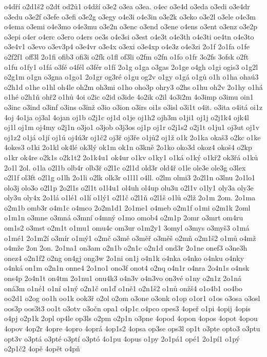 o4dří
o2d1š2
o2dť
od2ů1
o4dží
o3e2
o3ea
o3ea.
o4ec
o3e4d
o3eda
o3edi
o3e4dr
o3edu
o3e2f
o3efe
o3efi
o3e2g
o3egy
o4e3i
o4e3in
o3e2k
o3eko
o3e2l
o3ele
o4e3m
o4ema
o3emi
o4e3mo
o4e3mu
o3e2n
o3enc
o3end
o3ene
o4ens
o3ent
o3enz
o3e2p
o3epi
o4er
o4erc
o3ero
o4ers
oe3s
o4e3si
o3est
o4e3t
o4e3th
o4e3ti
oe4tn
o4e3to
o3e4v1
o3evo
o3ev3p4
o3e4vr
o3e4x
o3exi
o3e4xp
o4e3z
o4e3zi
2o1f
2o1fa
o1fe
o2f2f1
off3l
2o1fi
ofib3
ofi3i
o2fk
o1fl
of3li
o2fm
o2fn
o1fo
o1fr
3o2fs
3ofsk
o2ft
o1fu
o1fy1
o1fá
o3fé
o4fél
o3fér
o1fí
2o1g
o1ga
o3gas
2o1ge
o4gh
o1gi
ogis3
o1g2l
o2g1m
o1gn
o3gna
o1go1
2o1gr
og3ré
o1gu
og2v
o1gy
o1gá
o1gů
o1h
o1ha
ohaú3
o2h1d
o1he
o1hl
oh4le
oh2m
oh3mi
o1ho
oho3p
ohry3
o2hs
o1hu
oh2v
2o1hy
o1há
o1hé
o2h1ň
ohř2
o1hů
4oi
o2ic
o2id
o3ide
4o2ik
o2il
4o3i2m
4o3imp
o3imu
oin1
o3inc
o3ind
o3inf
o3ins
o3inž
o3io
o3ion
o3irs
oi1s
o3isl
o3i1t
o4it.
o3ita
o4itá
oi1z
4oj
4o1ja
oj3al
4ojan
oj1b
o2j1c
oj1d
o1je
oj1h2
ojh3m
o1ji1
oj1j
o2j1k4
ojk4l
oj1l
oj1m
oj4my
o2j1n
o3jo1
o3job
o3j3os
oj1p
oj1r
o2j1s2
o2j1t
o1ju1
oj3ut
oj1v
oj1z2
o1já
o1jí
oj1ú
oj4ú3r
oj1č2
oj3ř
oj3ře
o1jů2
oj1ž
o1k
2o1ka
okaš3
o2kc
o1ke
4okes3
o1ki
2o1kl
ok4lé
ok3lý
ok1m
ok1n
o3kně
2o1ko
oko3d
okoz4
okoš4
o2kp
o1kr
ok4re
o2k1s
o2k1t2
2o1k4u1
ok4ur
o1kv
o1ky1
o1ká
o1ký
o1kř2
ok3řá
o1ků
2o1l
2ol.
o1la
o2l1b
olb4r
olb3ř
o2l1c
o2l1d
old3r
old4ř
o1le
ole3e
ole3g
o3lex
o2l1f
ol3ft
o2l1g
o1lh
2o1li
o2lk
olk3r
o1l1l
o4ll.
o2lm
olmi3
2o2l1n
o3lnu
2o1lo1
olo3j
olo3o
o2l1p
2o2l1s
o2l1t
o1l4u1
ol4uh
ol4up
olu3u
o2l1v
o1ly1
oly3a
oly3e
oly3u
oly4x
2o1lá
o1lé1
o1lí
o1lý1
o2l1č
o2l1ň
o2l1š
o1lů
o2lž
2o1m
2om.
2o1ma
o2m1b
omb3r
o4m1c
o4mco
2o2m1d1
2o1me1
o4meb
o2m1f
o1mi
o2m1k
2oml
o1m1n
o3mne
o3mná
o3mní
o4mný
o1mo
omob4
o2m1p
2omr
o3mrt
om4ru
om1s2
o3mst
o2m1t
o1mu1
omu4c
om3ur
o1m2y1
3omyl
o3mys
o3myš3
o1má
o1mé1
2o1m2í
o3mír
o1mý1
o2mč
o3mě
o3měř
o3měš
o2mň
o2m1š2
o1mů
o4mž
o4mže
2on
2on.
2o1na1
on3am
o2n1b
o2n1c
o2n1d
ond3r
2o1ne
onef3
o3ne3h
onez4
o2n1f2
o2ng
on4gj
ong3w
2o1ni
on1j
o4n1k
o4nka
o4nko
o4nku
o4nky
o4nká
on1m
o2n1n
onne4
2o1no1
ono3f
onot4
o2nq
o4n1r
o4nra
2o4n1s
o4nsk
ons4p
2o4n1t
on4tm
2o1nu1
onu4k3
o4n3v
o4n3vo
on3vé
o1ny
o2n1z
2o1ná
oná3m
o1né1
o1ní
o1ný
o2n1č
on1ď
o1ně1
o2n1š2
o1nů
onžš4
o1o4b1
oo4bo
oo2d1
o2og
oo1h
oo1k
ook3ř
o2ol
o2om
o3one
o3onk
o1op
o1or1
o1os
o3osa
o3osl
oos3p
oos3t3
oo1t
o3otv
o3očn
opa1
o4p1c
o4pco
opes3
4opeř
o1pi
4opij
4opis
o4pj
o2p1k
2opl
op4le
op3ls
o2pm
o2p1n
o3pne
4opod
4opon
4opos
4opot
4opou
4opov
4op2r
4opre
4opro
4oprá
4op1s2
4opsa
op3se
ops3l
op1t
o3pte
opto3
o3ptu
opt3v
o3ptá
o3pté
o3ptí
o3ptó
4o1pu
4opus
o1py
2o1pá1
opé1
2o1pí1
o1pý
o2p1č2
4opě
4opět
o4pň
